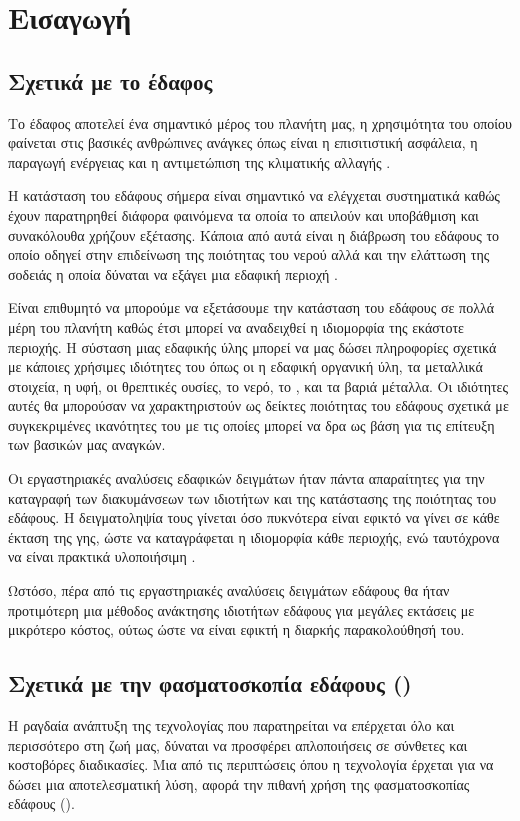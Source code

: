 \chapter{Εισαγωγή}
\label{ch:introduction}

\section{Σχετικά με το έδαφος}
Το έδαφος αποτελεί ένα σημαντικό μέρος του πλανήτη μας, η χρησιμότητα του οποίου φαίνεται στις βασικές ανθρώπινες ανάγκες όπως είναι η επισιτιστική ασφάλεια, η παραγωγή ενέργειας και η αντιμετώπιση της κλιματικής αλλαγής \cite{vis_near_spectr}.

Η κατάσταση του εδάφους σήμερα είναι σημαντικό να ελέγχεται συστηματικά καθώς έχουν παρατηρηθεί διάφορα φαινόμενα τα οποία το απειλούν και υποβάθμιση και συνακόλουθα χρήζουν εξέτασης. Κάποια από αυτά είναι η διάβρωση του εδάφους το οποίο οδηγεί στην επιδείνωση της ποιότητας του νερού αλλά και την ελάττωση της σοδειάς η οποία δύναται να εξάγει μια εδαφική περιοχή \cite{world_soil_under_threat}.

Είναι επιθυμητό να μπορούμε να εξετάσουμε την κατάσταση του εδάφους σε πολλά μέρη του πλανήτη καθώς έτσι μπορεί να αναδειχθεί η ιδιομορφία της εκάστοτε περιοχής. Η σύσταση μιας εδαφικής ύλης μπορεί να μας δώσει πληροφορίες σχετικά με κάποιες χρήσιμες ιδιότητες του όπως οι η εδαφική οργανική ύλη, τα μεταλλικά στοιχεία, η υφή, οι θρεπτικές ουσίες, το νερό, το , και τα βαριά μέταλλα. Οι ιδιότητες αυτές θα μπορούσαν να χαρακτηριστούν ως δείκτες ποιότητας του εδάφους σχετικά με συγκεκριμένες ικανότητες του με τις οποίες μπορεί να δρα ως βάση για τις επίτευξη των βασικών μας αναγκών.

Οι εργαστηριακές αναλύσεις εδαφικών δειγμάτων ήταν πάντα απαραίτητες για την καταγραφή των διακυμάνσεων των ιδιοτήτων και της κατάστασης της ποιότητας του εδάφους. Η δειγματοληψία τους γίνεται όσο πυκνότερα είναι εφικτό να γίνει σε κάθε έκταση της γης, ώστε να καταγράφεται η ιδιομορφία κάθε περιοχής, ενώ ταυτόχρονα να είναι πρακτικά υλοποιήσιμη \cite{soil_spectr}.

Ωστόσο, πέρα από τις εργαστηριακές αναλύσεις δειγμάτων εδάφους θα ήταν προτιμότερη μια μέθοδος ανάκτησης ιδιοτήτων εδάφους για μεγάλες εκτάσεις με μικρότερο κόστος, ούτως ώστε να είναι εφικτή η διαρκής παρακολούθησή του.

\section{Σχετικά με την φασματοσκοπία εδάφους ()}
Η ραγδαία ανάπτυξη της τεχνολογίας που παρατηρείται να επέρχεται όλο και περισσότερο στη ζωή μας, δύναται να προσφέρει απλοποιήσεις σε σύνθετες και κοστοβόρες διαδικασίες. Μια από τις περιπτώσεις όπου η τεχνολογία έρχεται για να δώσει μια αποτελεσματική λύση, αφορά την πιθανή χρήση της φασματοσκοπίας εδάφους ().

